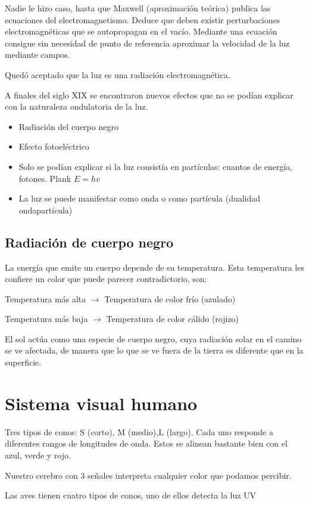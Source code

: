 Nadie le hizo caso, hasta que Maxwell (aproximación teórica) publica las ecuaciones del electromagnetismo. Deduce que deben existir perturbaciones electromagnéticas que se autopropagan en el vacío. Mediante una ecuación consigue sin necesidad de punto de referencia aproximar la velocidad de la luz mediante campos.

Quedó aceptado que la luz es una radiación electromagnética.

A finales del siglo XIX se encontraron nuevos efectos que no se podían explicar con la naturaleza ondulatoria de la luz.
\begin{itemize}
    \item Radiación del cuerpo negro
    \item Efecto fotoeléctrico
    \item Solo se podían explicar si la luz consistía en partículas: cuantos de energía, fotones. Plank $E=hv$
    \item La luz se puede manifestar como onda o como partícula (dualidad ondapartícula)
\end{itemize}

\subsection{Radiación de cuerpo negro}
La energía que emite un cuerpo depende de su temperatura. Esta temperatura les confiere un color que puede parecer contradictorio, son:

Temperatura más alta $\rightarrow$ Temperatura de color frío (azulado)

Temperatura más baja $\rightarrow$ Temperatura de color cálido (rojizo)

El sol actúa como una especie de cuerpo negro, cuya radiación solar en el camino se ve afectada, de manera que lo que se ve fuera de la tierra es diferente que en la superficie.

\section{Sistema visual humano}
Tres tipos de conos: S (corto), M (medio),L (largo). Cada uno responde a diferentes rangos de longitudes de onda. Estos se alinean bastante bien con el azul, verde y rojo.

Nuestro cerebro con 3 señales interpreta cualquier color que podamos percibir.

Las aves tienen cuatro tipos de conos, uno de ellos detecta la luz UV

